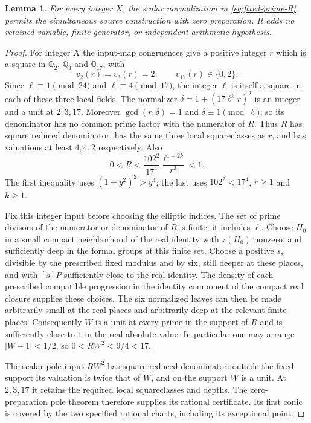 \documentclass[11pt,a4paper]{article}
\newtheorem{lemma}[theorem]{Lemma}
\theoremstyle{definition}
\theoremstyle{remark}
\begin{document}
\begin{lemma}
\label{lem:fixed-prime-completeness}
For every integer $X$, the scalar normalization in
\eqref{eq:fixed-prime-R} permits the simultaneous source construction
with zero preparation. It adds no retained variable, finite generator,
or independent arithmetic hypothesis.
\end{lemma}
\begin{proof}
For integer $X$ the input-map congruences give a positive integer $r$
which is a square in $\mathbb Q_2$, $\mathbb Q_3$ and
$\mathbb Q_{17}$, with
\[
                     v_2(r)=v_3(r)=2,\qquad v_{17}(r)\in\{0,2\}.
\]
Since $\ell\equiv1\pmod{24}$ and $\ell\equiv4\pmod{17}$, the
integer $\ell$ is itself a square in each of these three local fields.
The normalizer $\delta=1+(17\ell^k r)^2$ is an integer and a unit at
$2,3,17$. Moreover $\gcd(r,\delta)=1$ and $\delta\equiv1\pmod\ell$,
so its denominator has no common prime factor with the numerator of $R$.
Thus $R$ has square reduced denominator, has the same
three local squareclasses as $r$, and has valuations at least
$4,4,2$ respectively. Also
\[
 0<R<\frac{102^2}{17^4}\frac{\ell^{1-2k}}{r^3}<1.
\]
The first inequality uses $(1+y^2)^2>y^4$; the last uses
$102^2<17^4$, $r\ge1$ and $k\ge1$.

Fix this integer input before choosing the elliptic indices. The set
of prime divisors of the numerator or denominator of $R$ is finite;
it includes $\ell$. Choose $H_0$ in a small compact neighborhood
of the real identity with $z(H_0)$ nonzero, and sufficiently deep in
the formal groups at this finite set. Choose a positive $s$, divisible
by the prescribed fixed modulus and by six, still deeper at these
places, and with $[s]P$ sufficiently close to the real identity. The
density of each prescribed compatible progression in the identity
component of the compact real closure supplies these choices. The
six normalized leaves can then be made arbitrarily small at the real
places and arbitrarily deep at the relevant finite places. Consequently
$W$ is a unit at every prime in the support of $R$ and is sufficiently
close to $1$ in the real absolute value. In particular one may arrange
$|W-1|<1/2$, so $0<RW^2<9/4<17$.

The scalar pole input $RW^2$ has square reduced denominator: outside
the fixed support its valuation is twice that of $W$, and on the
support $W$ is a unit. At $2,3,17$ it retains the required local
squareclasses and depths. The zero-preparation pole theorem therefore
supplies its rational certificate. Its first conic is covered by the
two specified rational charts, including its exceptional point.


\end{proof}
\end{document}
